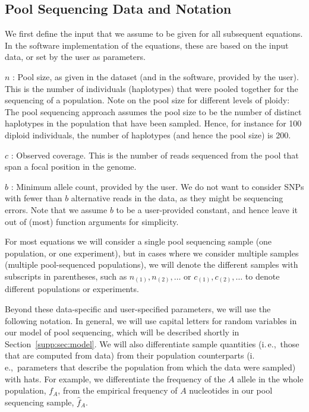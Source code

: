 \documentclass[letterpaper,fontsize=9pt,DIV=12]{scrartcl}
\newcounter{todo}
\newcommand\todo[1]{}
\newcommand\secref[1]{Section~\ref{#1}}
\newcommand{\samplesize}{n}
\newcommand{\coverage}{c}
\newcommand{\empfreq}{\widehat{f}}
\newcommand{\ie}{i.\,e.,~}
\begin{document}
\subsection{Pool Sequencing Data and Notation}
\label{supp:sec:Definitions:sub:PoolSequencing}

We first define the input that we assume to be given for all subsequent equations.
In the software implementation of the equations, these are based on the input data, or set by the user as parameters.

$\samplesize$ :
Pool size, as given in the dataset (and in the software, provided by the user). This is the number of individuals (haplotypes) that were pooled together for the sequencing of a population. Note on the pool size for different levels of ploidy:  The pool sequencing approach assumes the pool size to be the number of distinct haplotypes in the population that have been sampled. Hence, for instance for 100 diploid individuals, the number of haplotypes (and hence the pool size) is 200.

$\coverage$ :
Observed coverage. This is the number of reads sequenced from the pool that span a focal position in the genome. 

$b$ :
Minimum allele count, provided by the user.
We do not want to consider SNPs with fewer than $b$ alternative reads in the data, as they might be sequencing errors.
Note that we assume $b$ to be a user-provided constant,
and hence leave it out of (most) function arguments for simplicity.

For most equations we will consider a single pool sequencing sample (one population, or one experiment), but in cases where we consider multiple samples (multiple pool-sequenced populations), we will denote the different samples with subscripts in parentheses, such as $\samplesize_{(1)}, \samplesize_{(2)},\ldots$ or $\coverage_{(1)}, \coverage_{(2)}, \ldots$ to denote different populations or experiments.

Beyond these data-specific and user-specified parameters, we will use the following notation.  In general, we will use capital letters for random variables in our model of pool sequencing, which will be described shortly in \secref{supp:sec:model}.  We will also differentiate sample quantities (\ie those that are computed from data) from their population counterparts (\ie parameters that describe the population from which the data were sampled) with hats.  For example, we differentiate the frequency of the $A$ allele in the whole population, $f_A$, from the empirical frequency of $A$ nucleotides in our pool sequencing sample, $\empfreq_A$.
\end{document}
